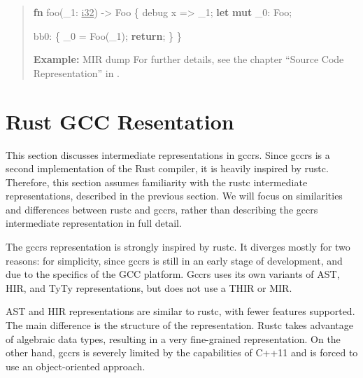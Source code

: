 \documentclass[
  11pt,
  twoside,symmetric]{report}
\newenvironment{Shaded}{}{}
\newcommand{\ControlFlowTok}[1]{\textbf{#1}}
\newcommand{\DataTypeTok}[1]{\underline{#1}}
\newcommand{\KeywordTok}[1]{\textbf{#1}}
\newcommand{\NormalTok}[1]{#1}
\newcommand{\OperatorTok}[1]{#1}
\begin{document}
\begin{quote}
\begin{Shaded}
\begin{Highlighting}[]
\KeywordTok{fn}\NormalTok{ foo(\_1}\OperatorTok{:} \DataTypeTok{i32}\NormalTok{) }\OperatorTok{{-}\textgreater{}}\NormalTok{ Foo }\OperatorTok{\{}
\NormalTok{    debug x }\OperatorTok{=\textgreater{}}\NormalTok{ \_1}\OperatorTok{;}
    \KeywordTok{let} \KeywordTok{mut}\NormalTok{ \_0}\OperatorTok{:}\NormalTok{ Foo}\OperatorTok{;}

\NormalTok{    bb0}\OperatorTok{:} \OperatorTok{\{}
\NormalTok{        \_0 }\OperatorTok{=}\NormalTok{ Foo(\_1)}\OperatorTok{;}
        \ControlFlowTok{return}\OperatorTok{;}
    \OperatorTok{\}}
\OperatorTok{\}}
\end{Highlighting}
\end{Shaded}

\textbf{Example:} MIR dump For further details, see the chapter ``Source
Code Representation'' in .
\end{quote}

\section{Rust GCC Resentation}\label{rust-gcc-resentation}

This section discusses intermediate representations in gccrs. Since
gccrs is a second implementation of the Rust compiler, it is heavily
inspired by rustc. Therefore, this section assumes familiarity with the
rustc intermediate representations, described in the previous section.
We will focus on similarities and differences between rustc and gccrs,
rather than describing the gccrs intermediate representation in full
detail.

The gccrs representation is strongly inspired by rustc. It diverges
mostly for two reasons: for simplicity, since gccrs is still in an early
stage of development, and due to the specifics of the GCC platform.
Gccrs uses its own variants of AST, HIR, and TyTy representations, but
does not use a THIR or MIR.

AST and HIR representations are similar to rustc, with fewer features
supported. The main difference is the structure of the representation.
Rustc takes advantage of algebraic data types, resulting in a very
fine-grained representation. On the other hand, gccrs is severely
limited by the capabilities of C++11 and is forced to use an
object-oriented approach.
\end{document}
